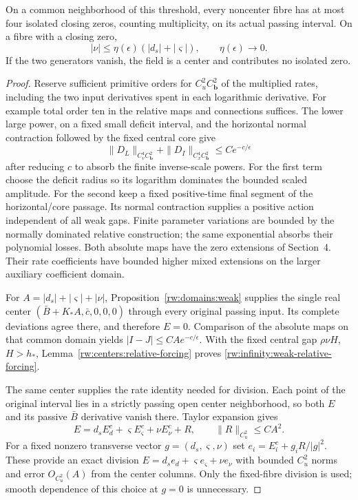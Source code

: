 \begin{proposition}
\label{rw:infinity:weak-center}
On a common neighborhood of this threshold, every noncenter fibre
has at most four isolated closing zeros, counting multiplicity,
on its actual passing interval. On a fibre with a closing zero,
\begin{equation}\label{rw:infinity:weak-relative-forcing}
 |\nu|\le\eta(\epsilon)(|d_s|+|\varsigma|),\qquad\eta(\epsilon)\to0.
\end{equation}
If the two generators vanish, the field is a center and contributes
no isolated zero.
\end{proposition}
\begin{proof}
Reserve sufficient primitive orders for $C_u^2C_{\mathbf b}^2$
of the multiplied rates, including the two input derivatives spent
in each logarithmic derivative. For example total order ten in the
relative maps and connections suffices. The lower large power, on
a fixed small deficit interval, and the horizontal normal contraction
followed by the fixed central core give
\[
 \|D_L\|_{C_v^4C_{\mathbf b}^2}
       +\|D_I\|_{C_x^4C_{\mathbf b}^2}\le Ce^{-c/\epsilon}
\]
after reducing $c$ to absorb the finite inverse-scale powers.
For the first term choose the deficit radius so its logarithm
dominates the bounded scaled amplitude. For the second keep a fixed
positive-time final segment of the horizontal/core passage. Its
normal contraction supplies a positive action independent of all
weak gaps. Finite parameter variations are bounded by the normally
dominated relative construction; the same exponential absorbs their
polynomial losses. Both absolute maps have the zero extensions of
Section~4. Their rate coefficients have bounded higher mixed
extensions on the larger auxiliary coefficient domain.

For $A=|d_s|+|\varsigma|+|\nu|$, Proposition~\ref{rw:domains:weak}
supplies the single real center
$(\bar B+K_*A,\bar c,0,0,0)$ through every original passing input.
Its complete deviations agree there, and therefore $E=0$.
Comparison of the absolute maps on that common domain yields
$|I-J|\le CAe^{-c/\epsilon}$. With the fixed central gap
$\rho\nu H$, $H>h_*$, Lemma~\ref{rw:centers:relative-forcing}
proves \eqref{rw:infinity:weak-relative-forcing}.

The same center supplies the rate identity needed for division.
Each point of the original interval lies in a strictly passing open
center neighborhood, so both $E$ and its passive $\bar B$
derivative vanish there. Taylor expansion gives
\[
 E=d_s E_d^c+\varsigma E_\varsigma^c+\nu E_\nu^c+R,\qquad
 \|R\|_{C_u^2}\le CA^2.
\]
For a fixed nonzero transverse vector $g=(d_s,\varsigma,\nu)$
set $e_i=E_i^c+g_iR/|g|^2$.
These provide an exact division $E=d_s e_d+\varsigma e_\varsigma+\nu e_\nu$
with bounded $C_u^2$ norms and error $O_{C_u^2}(A)$ from the center
columns. Only the fixed-fibre division is used; smooth dependence of
this choice at $g=0$ is unnecessary.


\end{proof}
